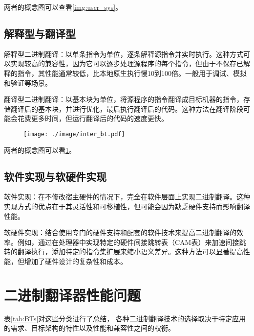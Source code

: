 两者的概念图可以查看\ref{img:user_sys}。

\subsection{解释型与翻译型}
解释型二进制翻译：以单条指令为单位，逐条解释源指令并实时执行。这种方式可以实现较高的兼容性，因为它可以逐步处理源程序的每个指令，但由于不保存已解释的指令，其性能通常较低，比本地原生执行慢10到100倍。一般用于调试、模拟和验证等场景。

翻译型二进制翻译：以基本块为单位，将源程序的指令翻译成目标机器的指令，存储翻译后的基本块，并进行优化，最后执行翻译后的代码。这种方法在翻译阶段可能会花费更多时间，但运行翻译后的代码的速度更快。

\begin{figure}[h]
  \centering
  \texttt{[image: ./image/inter\_bt.pdf]}
  \label{img:inter_bt}
\end{figure}

两者的概念图可以看\ref{img:inter_bt}。

\subsection{软件实现与软硬件实现}
软件实现：在不修改宿主硬件的情况下，完全在软件层面上实现二进制翻译。这种实现方式的优点在于其灵活性和可移植性，但可能会因为缺乏硬件支持而影响翻译性能。

软硬件实现：结合使用专门的硬件支持和配套的软件技术来提高二进制翻译的效率。例如，通过在处理器中实现特定的硬件间接跳转表（CAM表）来加速间接跳转的翻译执行\cite{Godson3}，添加特定的指令集扩展来缩小语义差异\cite{LoongISA}。这种方法可以显著提高性能，但增加了硬件设计的复杂性和成本。

\section{二进制翻译器性能问题}

表\ref{tab:BTs}对这些分类进行了总结，
各种二进制翻译技术的选择取决于特定应用的需求、目标架构的特性以及性能和兼容性之间的权衡。

